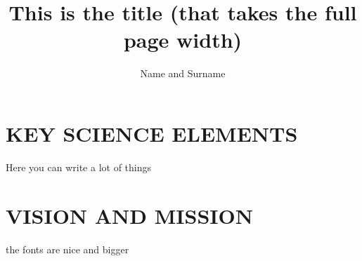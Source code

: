 \documentclass[36pt, portrait, a0, largefonts,plainboxedsections]{sciposter}
\title{This is the title (that takes the full page width)}
\author{Name and Surname}
\institute{Affiliation}
\begin{document}
\maketitle
\vspace{-50pt}

\begin{multicols}{2}
\def\columnseprulecolor{\color[rgb]{0.501,0.463,0.435}}


\section*{KEY SCIENCE ELEMENTS} 
Here you can write a lot of things
\vfill
\section*{VISION AND MISSION}
the fonts are nice and bigger
\end{multicols}
\end{document}
